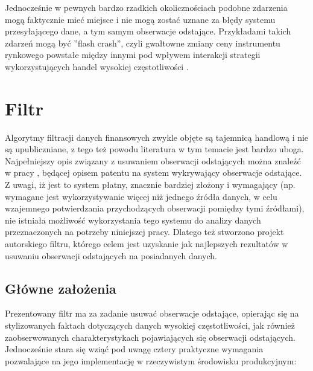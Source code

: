 \documentclass[a4paper,12pt,openany, DIV=calc, headsepline]{scrbook}
\begin{document}
Jednocześnie w pewnych bardzo rzadkich okolicznościach podobne zdarzenia mogą faktycznie mieć miejsce i nie mogą zostać uznane za błędy systemu przesyłającego dane, a tym samym obserwacje odstające. Przykładami takich zdarzeń mogą być ''flash crash'', czyli gwałtowne zmiany ceny instrumentu rynkowego powstałe między innymi pod wpływem interakcji strategii wykorzystujących handel wysokiej częstotliwości \citep{Easley2010}.

\chapter{Filtr}

\newcommand{\Spt}{\ensuremath{Sp_{t}} }

\newcommand{\MSpc}{\ensuremath{Sp_{t|t-1}} }
\newcommand{\MSpn}{\ensuremath{Sp_{t+1|t}} }
\newcommand{\MSpo}{\ensuremath{Sp_{t-1|t-1}} }

\newcommand{\ts}{\ensuremath{{t}} }
\newcommand{\tsl}{\ensuremath{{t-1}} }




Algorytmy filtracji danych finansowych zwykle objęte są tajemnicą handlową i nie są upubliczniane, z tego też powodu literatura w tym temacie jest bardzo uboga. Najpełniejszy opis związany z usuwaniem obserwacji odstających można znaleźć w pracy \citep{muller2010filtering}, będącej opisem patentu na system wykrywający obserwacje odstające. Z uwagi, iż jest to system płatny, znacznie bardziej złożony i wymagający (np. wymagane jest wykorzystywanie więcej niż jednego źródła danych, w celu wzajemnego potwierdzania przychodzących obserwacji pomiędzy tymi źródłami), nie istniała możliwość wykorzystania tego systemu do analizy danych przeznaczonych na potrzeby niniejszej pracy. Dlatego też stworzono projekt autorskiego filtru, którego celem jest uzyskanie jak najlepszych rezultatów w usuwaniu obserwacji odstających na posiadanych danych.

\section{Główne założenia}

Prezentowany filtr ma za zadanie usuwać obserwacje odstające, opierając się na stylizowanych faktach dotyczących danych wysokiej częstotliwości, jak również zaobserwowanych charakterystykach pojawiających się obserwacji odstających. Jednocześnie stara się wziąć pod uwagę cztery praktyczne wymagania pozwalające na jego implementację w rzeczywistym środowisku produkcyjnym:
\end{document}
